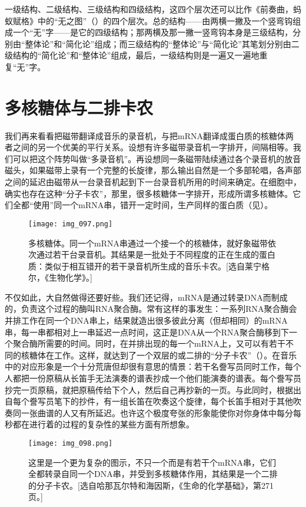 一级结构、二级结构、三级结构和四级结构，这四个层次还可以比作《前奏曲，蚂蚁赋格》中的“无之图”（）的四个层次。总的结构——由两横一撇及一个竖弯钩组成一个“无”字——是它的四级结构；那两横及那一撇一竖弯钩本身是三级结构，分别由“整体论”和“简化论”组成；而三级结构的“整体论”与“简化论”其笔划分别由二级结构的“简化论”和“整体论”组成，最后，一级结构则是一遍又一遍地重复“无”字。

\section{多核糖体与二排卡农}

我们再来看看把磁带翻译成音乐的录音机，与把mRNA翻译成蛋白质的核糖体两者之间的另一个优美的平行关系。设想有许多磁带录音机一字排开，间隔相等。我们可以把这个阵势叫做“多录音机”。再设想同一条磁带陆续通过各个录音机的放音磁头，如果磁带上录有一个完整的长旋律，那么输出自然是一个多部轮唱，各声部之间的延迟由磁带从一台录音机起到下一台录音机所用的时间来确定。在细胞中，确实也存在这种“分子卡农”，那里，很多核糖体一字排开，形成所谓多核糖体。它们全都“使用”同一个mRNA串，错开一定时间，生产同样的蛋白质（见）。

\begin{figure}
\texttt{[image: img\_097.png]}
\caption[多核糖体。]
  {多核糖体。同一个mRNA串通过一个接一个的核糖体，就好象磁带依次通过若干台录音机。其结果是一批处于不同程度的正在生成的蛋白质：类似于相互错开的若干录音机所生成的音乐卡农。[选自莱宁格尔，《生物化学》。] }
\end{figure}

不仅如此，大自然做得还要好些。我们还记得，mRNA是通过转录DNA而制成的，负责这个过程的酶叫RNA聚合酶。常有这样的事发生：一系列RNA聚合酶会并排工作在同一个DNA串上，结果就造出很多彼此分离（但却相同）的mRNA串，每一串都相对上一串延迟一点时间，这正是DNA从一个RNA聚合酶移到下一个聚合酶所需要的时间。同时，在并排出现的每一个mRNA上，又可以有若干不同的核糖体在工作。这样，就达到了一个双层的或二排的“分子卡农”（）。在音乐中的对应形象是一个十分荒唐但却很有意思的情景：若干名誊写员同时工作，每个人都把一份原稿从长笛手无法演奏的谱表抄成一个他们能演奏的谱表。每个誊写员抄完一页原稿，就把原稿传给下个人，然后自己再抄新的一页。与此同时，根据出自每个誊写员笔下的抄件，有一组长笛在吹奏这个旋律，每个长笛手相对于其他吹奏同一张曲谱的人又有所延迟。也许这个极度夸张的形象能使你对你身体中每分每秒都在进行着的过程的复杂性的某些方面有所想象。

\begin{figure}
\texttt{[image: img\_098.png]}
\caption[二排的分子卡农。]
  {这里是一个更为复杂的图示，不只一个而是有若干个mRNA串，它们全都转录自同一个DNA串，并受到多核糖体作用，其结果是一个二排的分子卡农。[选自哈那瓦尔特和海因斯，《生命的化学基础》，第271页。] }
\end{figure}

